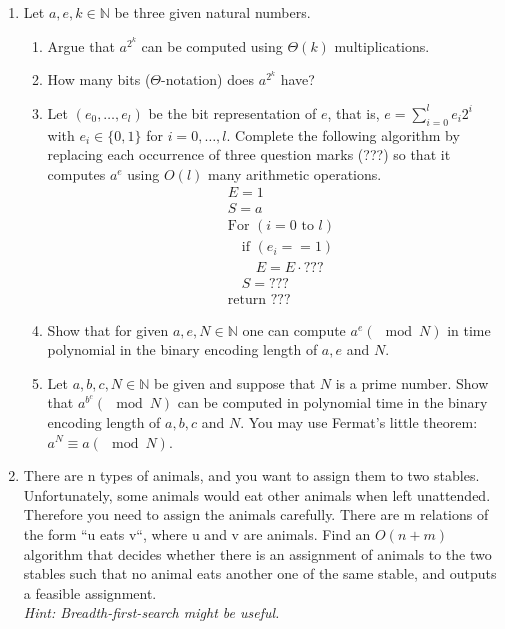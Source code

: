 \documentclass[11pt]{article}
\institute{\'Ecole Polytechnique F\'ed\'erale de Lausanne}
\newcommand{\setN}{\mathbb{N}}
\begin{document}
\makeheader

\begin{enumerate}[1)]



\item Let $a, e, k ∈ \setN$ be three given natural numbers.
\begin{enumerate}
\item Argue that $a^{2^k}$ can be computed using $Θ(k)$ multiplications.
\item How many bits ($Θ$-notation) does $a^{2^k}$ have?
\item Let $(e_0, \hdots, e_l)$ be the bit representation of $e$, that is, $e = \displaystyle\sum_{i= 0}^l e_i2^i$ with $e_i ∈ \{0, 1\}$ for $i= 0, \hdots, l$.
Complete the following algorithm by replacing each occurrence of three question marks (???) so
that it computes $a^e$ using $O(l)$ many arithmetic operations.
\begin{align*}
& E = 1\\
& S = a\\
&\text{For }(i=0 \text{ to }l) \\
& \quad \text{if  }(e_i == 1)\\
& \quad \quad E = E\cdot ??? \\
&\quad S = ??? \\
&\text{return }???
\end{align*}
\item Show that for given $a, e, N ∈ \setN$ one can compute $a^e (\mod N)$ in time polynomial in the binary
encoding length of $a, e$ and $N$.
\item Let $a, b, c, N ∈ \setN$ be given and suppose that $N$ is a prime number. Show that $a^{b^c} (\mod N)$ can
be computed in polynomial time in the binary encoding length of $a, b, c$ and $N$. You may use
Fermat’s little theorem: $a^N ≡ a (\mod N)$.
\end{enumerate}





\item There are n types of animals, and you want to assign them to two stables. Unfortunately,
some animals would eat other animals when left unattended. Therefore you need to assign
the animals carefully. There are m relations of the form “u eats v“, where u and v are animals.
Find an $O(n + m)$ algorithm that decides whether there is an assignment of animals to the
two stables such that no animal eats another one of the same stable, and outputs a feasible
assignment.\\
\textit{Hint: Breadth-first-search might be useful.}




\end{enumerate}
\end{document}
